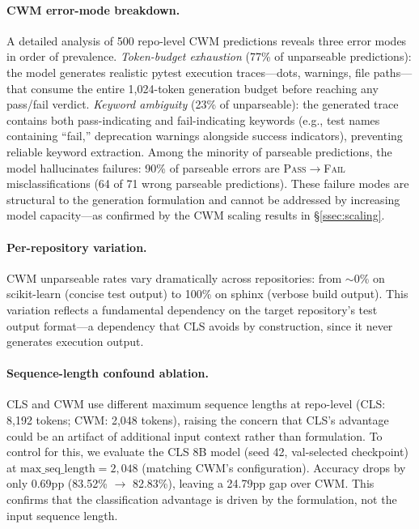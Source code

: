 \paragraph{CWM error-mode breakdown.}
A detailed analysis of 500 repo-level CWM predictions reveals three error modes in order of prevalence.
\emph{Token-budget exhaustion} (77\% of unparseable predictions): the model generates realistic pytest execution traces---dots, warnings, file paths---that consume the entire 1,024-token generation budget before reaching any pass/fail verdict.
\emph{Keyword ambiguity} (23\% of unparseable): the generated trace contains both pass-indicating and fail-indicating keywords (e.g., test names containing ``fail,'' deprecation warnings alongside success indicators), preventing reliable keyword extraction.
Among the minority of parseable predictions, the model hallucinates failures: 90\% of parseable errors are \textsc{Pass}$\to$\textsc{Fail} misclassifications (64 of 71 wrong parseable predictions).
These failure modes are structural to the generation formulation and cannot be addressed by increasing model capacity---as confirmed by the CWM scaling results in \S\ref{ssec:scaling}.

\paragraph{Per-repository variation.}
CWM unparseable rates vary dramatically across repositories: from $\sim$0\% on scikit-learn (concise test output) to 100\% on sphinx (verbose build output).
This variation reflects a fundamental dependency on the target repository's test output format---a dependency that CLS avoids by construction, since it never generates execution output.

\paragraph{Sequence-length confound ablation.}
CLS and CWM use different maximum sequence lengths at repo-level (CLS: 8,192 tokens; CWM: 2,048 tokens), raising the concern that CLS's advantage could be an artifact of additional input context rather than formulation.
To control for this, we evaluate the CLS 8B model (seed 42, val-selected checkpoint) at $\text{max\_seq\_length} = 2{,}048$ (matching CWM's configuration).
Accuracy drops by only 0.69pp (83.52\% $\to$ 82.83\%), leaving a 24.79pp gap over CWM.
This confirms that the classification advantage is driven by the formulation, not the input sequence length.


